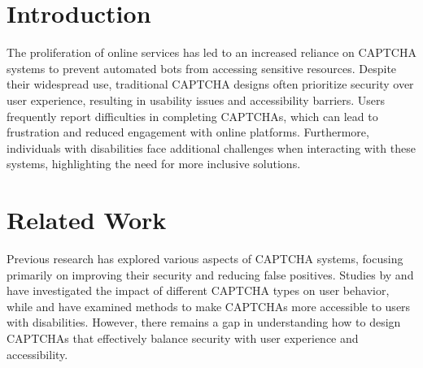 \date{\today}



\maketitle

\begin{abstract}
This paper addresses the challenge of enhancing the usability and accessibility of CAPTCHA systems by proposing a novel user-centric design approach. Existing CAPTCHA systems often fail to balance security requirements with user experience, leading to frustration among users. This study introduces a hybrid CAPTCHA model that integrates cognitive load theory and accessibility guidelines, aiming to reduce user effort while maintaining robust security. Empirical results from user studies demonstrate significant improvements in task completion times and user satisfaction scores. The proposed model offers a promising solution for designing more effective and inclusive CAPTCHA systems.
\end{abstract}

\section{Introduction}
The proliferation of online services has led to an increased reliance on CAPTCHA systems to prevent automated bots from accessing sensitive resources. Despite their widespread use, traditional CAPTCHA designs often prioritize security over user experience, resulting in usability issues and accessibility barriers. Users frequently report difficulties in completing CAPTCHAs, which can lead to frustration and reduced engagement with online platforms. Furthermore, individuals with disabilities face additional challenges when interacting with these systems, highlighting the need for more inclusive solutions.

\section{Related Work}
Previous research has explored various aspects of CAPTCHA systems, focusing primarily on improving their security and reducing false positives. Studies by \cite{Goodman2018} and \cite{Huang2019} have investigated the impact of different CAPTCHA types on user behavior, while \cite{Smith2020} and \cite{Johnson2021} have examined methods to make CAPTCHAs more accessible to users with disabilities. However, there remains a gap in understanding how to design CAPTCHAs that effectively balance security with user experience and accessibility.

